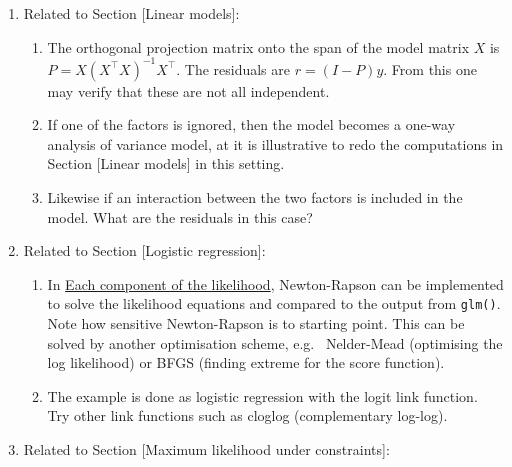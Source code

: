\begin{enumerate}
\def\labelenumi{\arabic{enumi}.}
\tightlist
\item
  Related to Section {[}Linear models{]}:

  \begin{enumerate}
  \def\labelenumii{\alph{enumii})}
  \tightlist
  \item
    The orthogonal projection
    matrix onto the span of the model matrix \(X\) is \(P=X (X^\top X)^{-1}X^\top\). The residuals are \(r=(I-P)y\). From this one may
    verify that these are not all independent.
  \item
    If one of the factors
    is ignored, then the model becomes a one-way analysis of variance
    model, at it is illustrative to redo the computations in Section
    {[}Linear models{]} in this setting.
  \item
    Likewise if an interaction between the two factors
    is included in the model. What are the residuals in this case?
  \end{enumerate}
\item
  Related to Section {[}Logistic regression{]}:

  \begin{enumerate}
  \def\labelenumii{\alph{enumii})}
  \tightlist
  \item
    In \protect\hyperlink{each-component-of-the-likelihood}{Each component of the
    likelihood}, Newton-Rapson can be implemented to solve the likelihood
    equations and compared to the output from \texttt{glm()}.
    Note how sensitive Newton-Rapson is to starting point.
    This can be solved by another optimisation scheme, e.g.~
    Nelder-Mead (optimising the log likelihood) or BFGS
    (finding extreme for the score function).
  \item
    The example is done as logistic regression with the logit
    link function. Try other link functions such as cloglog (complementary log-log).
  \end{enumerate}
\item
  Related to Section {[}Maximum likelihood under constraints{]}:


\end{enumerate}
